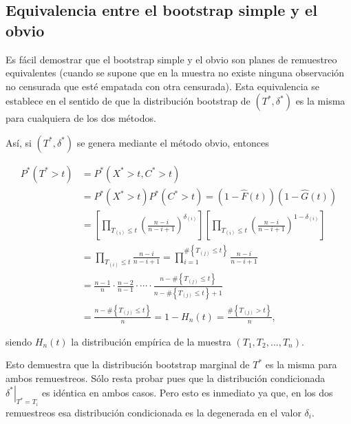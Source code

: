 \documentclass[
]{book}
\theoremstyle{break}
\theoremstyle{definition}
\theoremstyle{definition}
\theoremstyle{definition}
\theoremstyle{remark}
\begin{document}
\hypertarget{equivalencia-entre-el-bootstrap-simple-y-el-obvio}{%
\subsection{Equivalencia entre el bootstrap simple y el obvio}\label{equivalencia-entre-el-bootstrap-simple-y-el-obvio}}

Es fácil demostrar que el bootstrap simple y el obvio son planes de
remuestreo equivalentes (cuando se supone que en la muestra no existe
ninguna observación no censurada que esté empatada con otra censurada).
Esta equivalencia se establece en el sentido de que la distribución
bootstrap de \(\left( T^{\ast},\delta^{\ast} \right)\) es la misma para
cualquiera de los dos métodos.

Así, si \(\left( T^{\ast},\delta^{\ast} \right)\) se genera mediante el
método obvio, entonces

\[\begin{aligned}
P^{\ast}\left( T^{\ast}>t \right) &= P^{\ast}\left( X^{\ast}>t,C^{\ast
}>t \right) \\
&= P^{\ast}\left( X^{\ast}>t \right) P^{\ast}\left( C^{\ast}>t \right)
=\left( 1-\hat{F}\left( t \right) \right) \left( 1-\hat{G}\left( t \right)
 \right) \\
&= \left[ \prod_{T_{(i)}\leq t}\left( \frac{n-i}{n-i+1} \right)
^{\delta _{(i)}}\right] \left[ \prod_{T_{(i)}\leq
t}\left( \frac{n-i}{n-i+1} \right)^{1-\delta _{(i)}}\right] \\
&= \prod_{T_{(i)}\leq t}\frac{n-i}{n-i+1}=\prod_{i=1}^{\#\left
\{ T_{(j)}\leq t\right\} }\frac{n-i}{n-i+1} \\
&= \frac{n-1}{n}\cdot \frac{n-2}{n-1}\cdot \cdots \cdot \frac{n-\#\left\{
T_{(j)}\leq t\right\} }{n-\#\left\{ T_{(j)}\leq
t\right\} +1} \\
&= \frac{n-\#\left\{ T_{(j)}\leq t\right\} }{n}=1-H_n\left(
t \right) =\frac{\#\left\{ T_{(j)}>t\right\} }{n},
\end{aligned}\]

siendo \(H_n\left( t \right)\) la distribución empírica de la muestra
\(\left( T_1,T_2,\ldots ,T_n \right)\).

Esto demuestra que la distribución bootstrap marginal de \(T^{\ast}\) es
la misma para ambos remuestreos. Sólo resta probar pues que la
distribución condicionada
\(\left. \delta^{\ast}\right\vert _{T^{\ast}=T_i}\) es idéntica en
ambos casos. Pero esto es inmediato ya que, en los dos remuestreos esa
distribución condicionada es la degenerada en el valor
\(\delta _i\).
\end{document}
